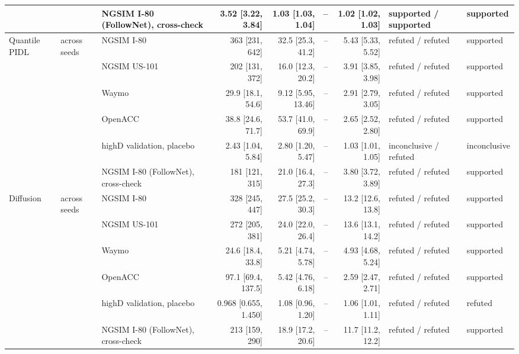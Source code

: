 \begin{longtable}{lllrrrrll}
 &  & NGSIM I-80 (FollowNet), cross-check & 3.52 [3.22, 3.84] & 1.03 [1.03, 1.04] & -- & 1.02 [1.02, 1.03] & supported / supported & supported \\
\midrule
Quantile PIDL & across seeds & NGSIM I-80 & 363 [231, 642] & 32.5 [25.3, 41.2] & -- & 5.43 [5.33, 5.52] & refuted / refuted & supported \\
 &  & NGSIM US-101 & 202 [131, 372] & 16.0 [12.3, 20.2] & -- & 3.91 [3.85, 3.98] & refuted / refuted & supported \\
 &  & Waymo & 29.9 [18.1, 54.6] & 9.12 [5.95, 13.46] & -- & 2.91 [2.79, 3.05] & refuted / refuted & supported \\
 &  & OpenACC & 38.8 [24.6, 71.7] & 53.7 [41.0, 69.9] & -- & 2.65 [2.52, 2.80] & refuted / refuted & supported \\
 &  & highD validation, placebo & 2.43 [1.04, 5.84] & 2.80 [1.20, 5.47] & -- & 1.03 [1.01, 1.05] & inconclusive / refuted & inconclusive \\
 &  & NGSIM I-80 (FollowNet), cross-check & 181 [121, 315] & 21.0 [16.4, 27.3] & -- & 3.80 [3.72, 3.89] & refuted / refuted & supported \\
\midrule
Diffusion & across seeds & NGSIM I-80 & 328 [245, 447] & 27.5 [25.2, 30.3] & -- & 13.2 [12.6, 13.8] & refuted / refuted & supported \\
 &  & NGSIM US-101 & 272 [205, 381] & 24.0 [22.0, 26.4] & -- & 13.6 [13.1, 14.2] & refuted / refuted & supported \\
 &  & Waymo & 24.6 [18.4, 33.8] & 5.21 [4.74, 5.78] & -- & 4.93 [4.68, 5.24] & refuted / refuted & supported \\
 &  & OpenACC & 97.1 [69.4, 137.5] & 5.42 [4.76, 6.18] & -- & 2.59 [2.47, 2.71] & refuted / refuted & supported \\
 &  & highD validation, placebo & 0.968 [0.655, 1.450] & 1.08 [0.96, 1.20] & -- & 1.06 [1.01, 1.11] & refuted / refuted & refuted \\
 &  & NGSIM I-80 (FollowNet), cross-check & 213 [159, 290] & 18.9 [17.2, 20.6] & -- & 11.7 [11.2, 12.2] & refuted / refuted & supported \\
\end{longtable}
\endgroup
